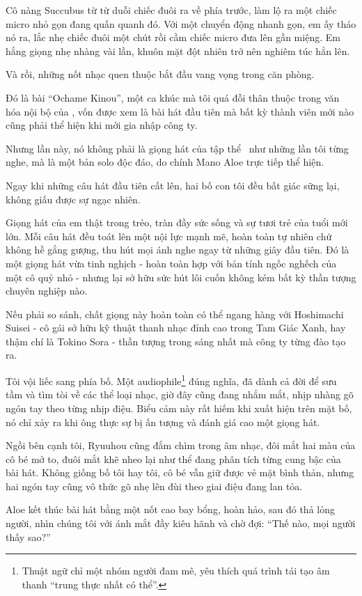 \documentclass[../main.tex]{subfiles}
\begin{document}
Cô nàng Succubus từ từ duỗi chiếc đuôi ra về phía trước, làm lộ ra một chiếc micro nhỏ gọn đang quấn quanh đó. Với một chuyển động nhanh gọn, em ấy tháo nó ra, lắc nhẹ chiếc đuôi một chút rồi cầm chiếc micro đưa lên gần miệng. Em hắng giọng nhẹ nhàng vài lần, khuôn mặt đột nhiên trở nên nghiêm túc hẳn lên.

Và rồi, những nốt nhạc quen thuộc bắt đầu vang vọng trong căn phòng.

Đó là bài ``Ochame Kinou'', một ca khúc mà tôi quá đỗi thân thuộc trong văn hóa nội bộ của \hll, vốn được xem là bài hát đầu tiên mà bất kỳ thành viên mới nào cũng phải thể hiện khi mới gia nhập công ty.

Nhưng lần này, nó không phải là giọng hát của tập thể \hll\ như những lần tôi từng nghe, mà là một bản solo độc đáo, do chính Mano Aloe trực tiếp thể hiện.

Ngay khi những câu hát đầu tiên cất lên, hai bố con tôi đều bất giác sững lại, không giấu được sự ngạc nhiên.

Giọng hát của em thật trong trẻo, tràn đầy sức sống và sự tươi trẻ của tuổi mới lớn. Mỗi câu hát đều toát lên một nội lực mạnh mẽ, hoàn toàn tự nhiên chứ không hề gắng gượng, thu hút mọi ánh nghe ngay từ những giây đầu tiên. Đó là một giọng hát vừa tinh nghịch - hoàn toàn hợp với bản tính ngốc nghếch của một cô quỷ nhỏ - nhưng lại sở hữu sức hút lôi cuốn không kém bất kỳ thần tượng chuyên nghiệp nào.

Nếu phải so sánh, chất giọng này hoàn toàn có thể ngang hàng với Hoshimachi Suisei - cô gái sở hữu kỹ thuật thanh nhạc đỉnh cao trong Tam Giác Xanh, hay thậm chí là Tokino Sora - thần tượng trong sáng nhất mà công ty từng đào tạo ra.

Tôi vội liếc sang phía bố. Một audiophile\footnote{Thuật ngữ chỉ một nhóm người đam mê, yêu thích quá trình tái tạo âm thanh ``trung thực nhất có thể''.} đúng nghĩa, đã dành cả đời để sưu tầm và tìm tòi về các thể loại nhạc, giờ đây cũng đang nhắm mắt, nhịp nhàng gõ ngón tay theo từng nhịp điệu. Biểu cảm này rất hiếm khi xuất hiện trên mặt bố, nó chỉ xảy ra khi ông thực sự bị ấn tượng và đánh giá cao một giọng hát.

Ngồi bên cạnh tôi, Ryuuhou cũng đắm chìm trong âm nhạc, đôi mắt hai màu của cô bé mở to, đuôi mắt khẽ nheo lại như thể đang phân tích từng cung bậc của bài hát. Không giống bố tôi hay tôi, cô bé vẫn giữ được vẻ mặt bình thản, nhưng hai ngón tay cũng vô thức gõ nhẹ lên đùi theo giai điệu đang lan tỏa.

Aloe kết thúc bài hát bằng một nốt cao bay bổng, hoàn hảo, sau đó thả lỏng người, nhìn chúng tôi với ánh mắt đầy kiêu hãnh và chờ đợi: ``Thế nào, mọi người thấy sao?''
\end{document}

